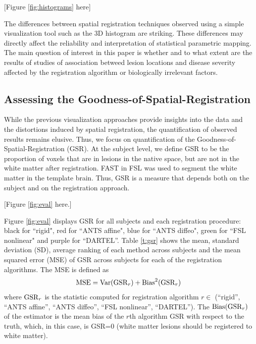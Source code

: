 \documentclass[10pt]{article}
\begin{document}
[Figure \ref{fig:histograms} here]

The differences between spatial registration techniques observed using a simple visualization tool such as the 3D histogram are striking. These differences may directly affect the reliability and interpretation of statistical parametric mapping. The main question of interest in this paper is whether and to what extent are the results of studies of association betweed lesion locations and disease severity affected by the registration algorithm or biologically irrelevant factors.


\subsection*{Assessing the Goodness-of-Spatial-Registration}

While the previous visualization approaches provide insights into
the data and the distortions induced by spatial registration, the
quantification of observed results remains elusive. Thus, we focus
on quantification of the Goodness-of-Spatial-Registration (GSR). At
the subject level, we define GSR to be the proportion of voxels that
are in lesions in the native space, but are not in the white matter
after registration. FAST in FSL was used to segment the white matter in the template brain. Thus, GSR is a measure that depends both on the
subject and on the registration approach.

[Figure \ref{fig:eval} here.]

Figure \ref{fig:eval} displays GSR for all subjects and each registration procedure: black for ``rigid", red for ``ANTS affine", blue for ``ANTS diffeo",  green for ``FSL nonlinear" and purple for ``DARTEL''.  Table \ref{t:gsr} shows the mean, standard deviation (SD), average ranking of each method across subjects and  the mean squared error (MSE) of GSR across subjects for each of the registration algorithms. The MSE is defined as
\begin{equation}\nonumber
{\rm MSE} = {\rm Var}({\rm GSR}_r) + {\rm Bias}^2({\rm GSR}_r)
\end{equation}
where ${\rm GSR}_r$ is the statistic computed for registration algorithm $r \in $  (``rigid'', ``ANTS affine'', ``ANTS diffeo'', ``FSL nonlinear'', ``DARTEL''). The ${\rm Bias}({\rm GSR}_r)$ of the estimator is the mean bias of the $r$th algorithm GSR with respect to the truth, which, in this case, is GSR=0 (white matter lesions should be registered to white matter).
\end{document}
